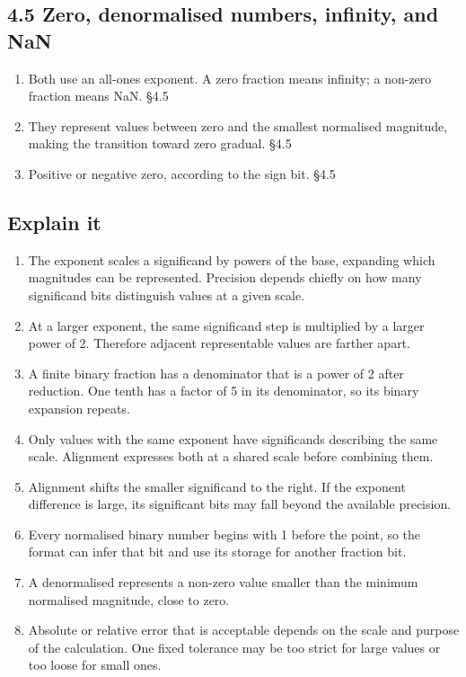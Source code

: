 \documentclass[11pt]{article}
\begin{document}
\begin{keepsection}\subsection{4.5 Zero, denormalised numbers, infinity, and NaN}

\begin{enumerate}
\item Both use an all-ones exponent. A zero fraction means infinity; a non-zero fraction means NaN. \hfill{\small\color{FAUblue}§4.5}
\item They represent values between zero and the smallest normalised magnitude, making the transition toward zero gradual. \hfill{\small\color{FAUblue}§4.5}
\item Positive or negative zero, according to the sign bit. \hfill{\small\color{FAUblue}§4.5}
\end{enumerate}

\end{keepsection}
\begin{keepsection}\subsection{Explain it}

\begin{enumerate}
\item The exponent scales a significand by powers of the base, expanding which magnitudes can be represented. Precision depends chiefly on how many significand bits distinguish values at a given scale.
\item At a larger exponent, the same significand step is multiplied by a larger power of 2. Therefore adjacent representable values are farther apart.
\item A finite binary fraction has a denominator that is a power of 2 after reduction. One tenth has a factor of 5 in its denominator, so its binary expansion repeats.
\item Only values with the same exponent have significands describing the same scale. Alignment expresses both at a shared scale before combining them.
\item Alignment shifts the smaller significand to the right. If the exponent difference is large, its significant bits may fall beyond the available precision.
\item Every normalised binary number begins with 1 before the point, so the format can infer that bit and use its storage for another fraction bit.
\item A denormalised represents a non-zero value smaller than the minimum normalised magnitude, close to zero.
\item Absolute or relative error that is acceptable depends on the scale and purpose of the calculation. One fixed tolerance may be too strict for large values or too loose for small ones.
\end{enumerate}

\end{keepsection}
\end{document}
